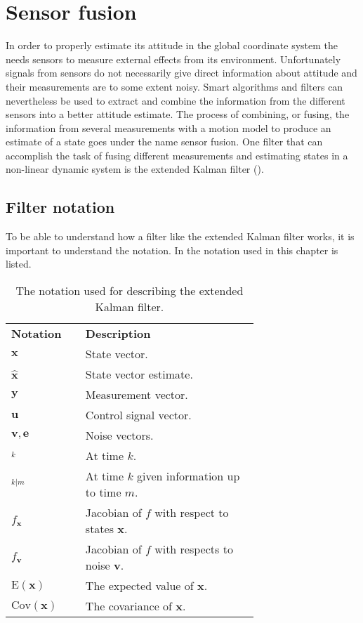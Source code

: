 \chapter{Sensor fusion}\label{cha:sensor_fusion}
In order to properly estimate its attitude in the global coordinate system the \abbrROV needs sensors to measure external effects from its environment.
Unfortunately signals from sensors do not necessarily give direct information about attitude and their measurements are to some extent noisy. Smart algorithms and filters can nevertheless be used to extract and combine the information from the different sensors into a better attitude estimate. The process of combining, or fusing, the information from several measurements with a motion model to produce an estimate of a state goes under the name sensor fusion. One filter that can accomplish the task of fusing different measurements and estimating states in a non-linear dynamic system is the extended Kalman filter (\abbrEKF). 
\section{Filter notation}
To be able to understand how a filter like the extended Kalman filter works, it is important to understand the notation. In   the notation used in this chapter is listed.
 \begin{table}[htbp]
  \centering
  \caption{\label{tab:notationKalman}%
    The notation used for describing the extended Kalman filter.}
    \begin{tabular}{l p{0.7\linewidth}}
    \toprule%
    \textbf{Notation} & \textbf{Description} \\
    \otoprule%
    $\boldsymbol{x}$ & State vector.\\
    $\hat{\boldsymbol{x}}$ & State vector estimate.\\
    $\boldsymbol{y}$ & Measurement vector.\\
    $\boldsymbol{u}$ & Control signal vector.\\
    $\boldsymbol{v},\boldsymbol{e}$ & Noise vectors.\\
    $_k$ & At time $k$.\\
    $_{k|m}$ & At time $k$ given information up to time $m$.\\
    $f_{\boldsymbol{x}}$ & Jacobian of $f$ with respect to states $\boldsymbol{x}$.\\
    $f_{\boldsymbol{v}}$ & Jacobian of $f$ with respects to noise $\boldsymbol{v}$.\\
    $\text{E}(\boldsymbol{x})$ & The expected value of $\boldsymbol{x}$.\\
    $\text{Cov}(\boldsymbol{x})$ & The covariance of $\boldsymbol{x}$.\\
    \bottomrule%
 \end{tabular}
\end{table}

